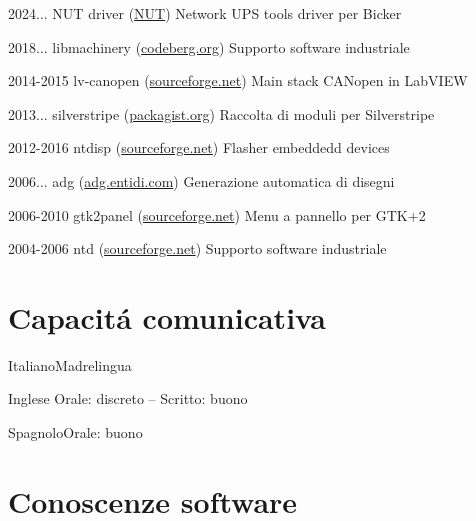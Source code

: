 \documentclass[fontsize=10pt]{tccv}
\begin{document}
\begin{yearlist}

\item{2024...}
     {NUT driver (\href{https://networkupstools.org/docs/man/bicker\_ser.html}{NUT})}
     {Network UPS tools driver per Bicker}

\item{2018...}
     {libmachinery (\href{https://codeberg.org/ntd/libmachinery}{codeberg.org})}
     {Supporto software industriale}

\item{2014-2015}
     {lv-canopen (\href{https://sourceforge.net/projects/lv-canopen/}{sourceforge.net})}
     {Main stack CANopen in LabVIEW}

\item{2013...}
     {silverstripe (\href{https://packagist.org/packages/entidi/}{packagist.org})}
     {Raccolta di moduli per Silverstripe}

\item{2012-2016}
     {ntdisp (\href{https://sourceforge.net/projects/ntdisp/}{sourceforge.net})}
     {Flasher embeddedd devices}

\item{2006...}
     {adg (\href{https://adg.entidi.com/}{adg.entidi.com})}
     {Generazione automatica di disegni}

\item{2006-2010}
     {gtk2panel (\href{https://sourceforge.net/projects/gtk2panel/}{sourceforge.net})}
     {Menu a pannello per GTK+2}

\item{2004-2006}
     {ntd (\href{https://sourceforge.net/projects/ntd/}{sourceforge.net})}
     {Supporto software industriale}

\end{yearlist}

\section{Capacit\'a comunicativa}

\begin{factlist}
\item{Italiano}{Madrelingua}
\item{Inglese} {Orale: discreto -- Scritto: buono}
\item{Spagnolo}{Orale: buono}
\end{factlist}

\section{Conoscenze software}
\end{document}
